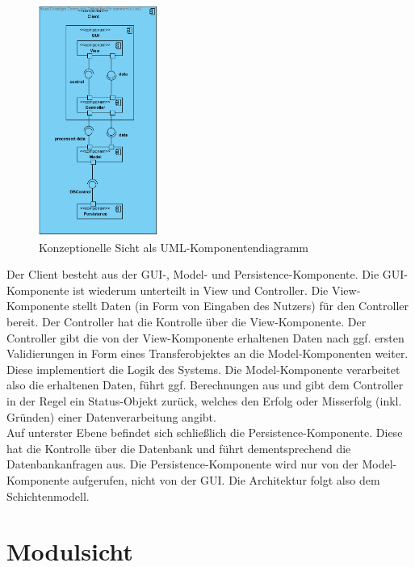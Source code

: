 \documentclass[fontsize=12pt,paper=a4,twoside]{scrartcl}
\begin{document}
\begin{figure}[H]
\centering
\includegraphics[width=0.35\textwidth]{konzept_sicht.png}
\caption{Konzeptionelle Sicht als UML-Komponentendiagramm}
\end{figure}

Der Client besteht aus der GUI-, Model- und Persistence-Komponente. Die GUI-Komponente ist wiederum unterteilt in View und Controller. Die View-Komponente stellt Daten (in Form von Eingaben des Nutzers) für den Controller bereit. Der Controller hat die Kontrolle über die View-Komponente. Der Controller gibt die von der View-Komponente erhaltenen Daten nach ggf. ersten Validierungen in Form eines Transferobjektes an die Model-Komponenten weiter. Diese implementiert die Logik des Systems. Die Model-Komponente verarbeitet also die erhaltenen Daten, führt ggf. Berechnungen aus und gibt dem Controller in der Regel ein Status-Objekt zurück, welches den Erfolg oder Misserfolg (inkl. Gründen) einer Datenverarbeitung angibt. \\
Auf unterster Ebene befindet sich schließlich die Persistence-Komponente. Diese hat die Kontrolle über die Datenbank und führt dementsprechend die Datenbankanfragen aus. Die Persistence-Komponente wird nur von der Model-Komponente aufgerufen, nicht von der GUI. Die Architektur folgt also dem Schichtenmodell.

\section{Modulsicht}
\label{sec:modulsicht}
\end{document}
